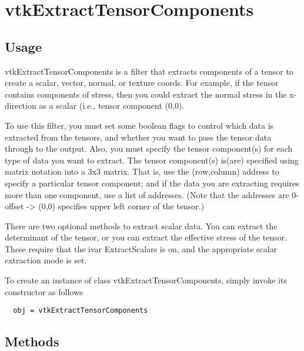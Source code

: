 \section{vtkExtractTensorComponents}

\subsection{Usage}

 vtkExtractTensorComponents is a filter that extracts components of
 a tensor to create a scalar, vector, normal, or texture coords. For
 example, if the tensor contains components of stress, then you
 could extract the normal stress in the x-direction as a scalar
 (i.e., tensor component (0,0).
 
 To use this filter, you must set some boolean flags to control
 which data is extracted from the tensors, and whether you want to
 pass the tensor data through to the output. Also, you must specify
 the tensor component(s) for each type of data you want to
 extract. The tensor component(s) is(are) specified using matrix notation
 into a 3x3 matrix. That is, use the (row,column) address to specify
 a particular tensor component; and if the data you are extracting
 requires more than one component, use a list of addresses. (Note
 that the addresses are 0-offset -> (0,0) specifies upper left
 corner of the tensor.)

 There are two optional methods to extract scalar data. You can
 extract the determinant of the tensor, or you can extract the
 effective stress of the tensor. These require that the ivar
 ExtractScalars is on, and the appropriate scalar extraction mode is
 set.

To create an instance of class vtkExtractTensorComponents, simply
invoke its constructor as follows
\begin{verbatim}
  obj = vtkExtractTensorComponents
\end{verbatim}
\subsection{Methods}

